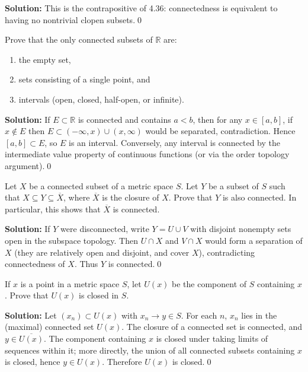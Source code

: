 \noindent\textbf{Solution:}
This is the contrapositive of 4.36: connectedness is equivalent to having no nontrivial clopen subsets.\qed



\begin{problembox}
Prove that the only connected subsets of $\mathbb{R}$ are:
\begin{enumerate}[label=(\alph*)]
\item the empty set,
\item sets consisting of a single point, and
\item intervals (open, closed, half-open, or infinite).
\end{enumerate}
\end{problembox}

\noindent\textbf{Solution:}
If $E\subset\mathbb{R}$ is connected and contains $a<b$, then for any $x\in[a,b]$, if $x\notin E$ then $E\subset(-\infty,x)\cup(x,\infty)$ would be separated, contradiction. Hence $[a,b]\subset E$, so $E$ is an interval. Conversely, any interval is connected by the intermediate value property of continuous functions (or via the order topology argument).\qed



\begin{problembox}
Let $X$ be a connected subset of a metric space $S$. Let $Y$ be a subset of $S$ such that $X \subseteq Y \subseteq \overline{X}$, where $\overline{X}$ is the closure of $X$. Prove that $Y$ is also connected. In particular, this shows that $\overline{X}$ is connected.
\end{problembox}

\noindent\textbf{Solution:}
If $Y$ were disconnected, write $Y=U\cup V$ with disjoint nonempty sets open in the subspace topology. Then $U\cap X$ and $V\cap X$ would form a separation of $X$ (they are relatively open and disjoint, and cover $X$), contradicting connectedness of $X$. Thus $Y$ is connected.\qed



\begin{problembox}
If $x$ is a point in a metric space $S$, let $U(x)$ be the component of $S$ containing $x$. Prove that $U(x)$ is closed in $S$.
\end{problembox}

\noindent\textbf{Solution:}
Let $(x_n)\subset U(x)$ with $x_n\to y\in S$. For each $n$, $x_n$ lies in the (maximal) connected set $U(x)$. The closure of a connected set is connected, and $y\in\overline{U(x)}$. The component containing $x$ is closed under taking limits of sequences within it; more directly, the union of all connected subsets containing $x$ is closed, hence $y\in U(x)$. Therefore $U(x)$ is closed.\qed




